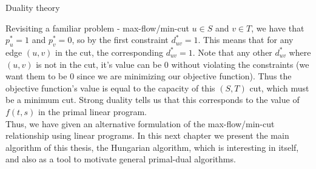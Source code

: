 \begin{section}{Duality theory}
\begin{subsection}{Revisiting a familiar problem - max-flow/min-cut}
	$u\in S$ and $v\in T$, we have that $p_u^{*} = 1$ and $p_v^{*} = 0$, so by the first constraint 
	$d_{uv}^{*} = 1$. This means that for any edge $(u,v)$ in the cut, the corresponding 
	$d_{uv}^{*} = 1$. Note that any other $d_{uv}^{*}$ where $(u,v)$ is not in the cut, it's value 
	can be 0 without violating the constraints (we want them to be 0 since we are minimizing our 
	objective function). Thus the objective function's value is equal to the capacity of this 
	$(S,T)$ cut, which must be a minimum cut. Strong duality tells us that this corresponds to the 
	value of $f(t,s)$ in the primal linear program.\\
	Thus, we have given an alternative formulation of the max-flow/min-cut relationship using 
	linear programs. In this next chapter we present the main algorithm of this thesis, the 
	Hungarian algorithm, which is interesting in itself, and also as a tool to motivate general 
	primal-dual algorithms.
\end{subsection}
\end{section}
